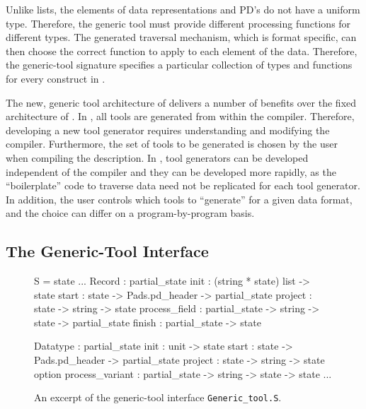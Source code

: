 Unlike lists, the elements of data representations and PD's do not
have a uniform type. Therefore, the generic tool must provide
different processing functions for different types. The generated
traversal mechanism, which is format specific, can then choose the
correct function to apply to each element of the data. Therefore, the
generic-tool signature specifies a particular collection of types and
functions for every construct in \padsml{}.

The new, generic tool architecture of \padsml{} delivers a number of
benefits over the fixed architecture of \padsc{}. In \padsc{}, all
tools are generated from within the compiler. Therefore, developing a
new tool generator requires understanding and modifying the compiler.
Furthermore, the set of tools to be generated is chosen by the user
when compiling the description.  In \padsml{}, tool generators can be
developed independent of the compiler and they can be developed more
rapidly, as the ``boilerplate'' code to traverse data need not be
replicated for each tool generator. In addition, the user controls
which tools to ``generate'' for a given data format, and the choice
can differ on a program-by-program basis.

\subsection{The Generic-Tool Interface}
\label{sec:gentool-interface}

\begin{figure}
\begin{code}\scriptsize
{}  S = 
   state
  ...
   Record : 
     partial_state
      init          : (string * state) list -> state
      start         : state -> Pads.pd_header 
                         -> partial_state
      project       : state -> string -> state
      process_field : partial_state -> string
                         -> state -> partial_state
      finish        : partial_state -> state

   Datatype : 
     partial_state
      init            : unit -> state
      start           : state -> Pads.pd_header 
                           -> partial_state
      project         : state -> string -> state option
      process_variant : partial_state -> string 
                           -> state -> state
   ...
\end{code}
\caption{An excerpt of the generic-tool interface \texttt{Generic\_tool.S}.}
\label{fig:gentool-interface}
\end{figure}


